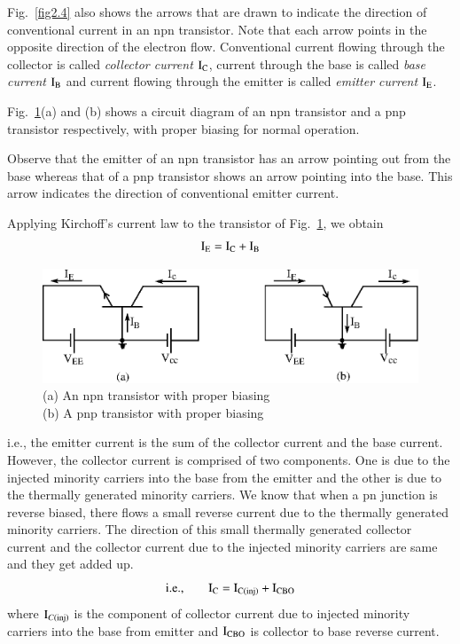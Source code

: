 Fig.~\ref{fig2.4} also shows the arrows that are drawn to indicate the direction of conventional current in an npn transistor. Note that each arrow points in the opposite direction of the electron flow. Conventional current flowing through the collector is called {\em collector current} $\textrm{I}_{\textrm{C}}$, current through the base is called {\em base current} $\textrm{I}_{\textrm{B}}$ and current flowing through the emitter is called {\em emitter current} $\textrm{I}_{\textrm{E}}$.

Fig.~\ref{fig2.5}(a) and (b) shows a circuit diagram of an npn transistor and a pnp transistor respectively, with proper biasing for normal operation.


Observe that the emitter of an npn transistor has an arrow pointing out from the base whereas that of a pnp transistor shows an arrow pointing into the base. This arrow indicates the direction of conventional emitter current.

Applying Kirchoff's current law to the transistor of Fig.~\ref{fig2.5}, we obtain
\begin{equation}
\textrm{I}_{\textrm{E}}=\textrm{I}_{\textrm{C}}+\textrm{I}_{\textrm{B}}\label{eq2.1}
\end{equation}

\vfill\eject

\begin{figure}[H]
\centering
\includegraphics{chap2/fig5.eps}
\caption{(a) An npn transistor with proper biasing\\ (b) A pnp transistor with proper biasing}\label{fig2.5}
\end{figure}

\noindent
i.e., the emitter current is the sum of the collector current and the base current. However, the collector current is comprised of two components. One is due to the injected minority carriers into the base from the emitter and the other is due to the thermally generated minority carriers. We know that when a pn junction is reverse biased, there flows a small reverse current due to the thermally generated minority carriers. The direction of this small thermally generated collector current and the collector current due to the injected minority carriers are same and they get added up.
\begin{equation}
\text{i.e.,}\qquad \textrm{I}_{\textrm{C}}=\textrm{I}_{\textrm{C}(\text{inj})}+\textrm{I}_{\text{CBO}}\label{eq2.2}
\end{equation}
where $\textrm{I}_{C(\text{inj})}$ is the component of collector current due to injected minority carriers into the base from emitter and $\textrm{I}_{\text{CBO}}$ is collector to base reverse current.


